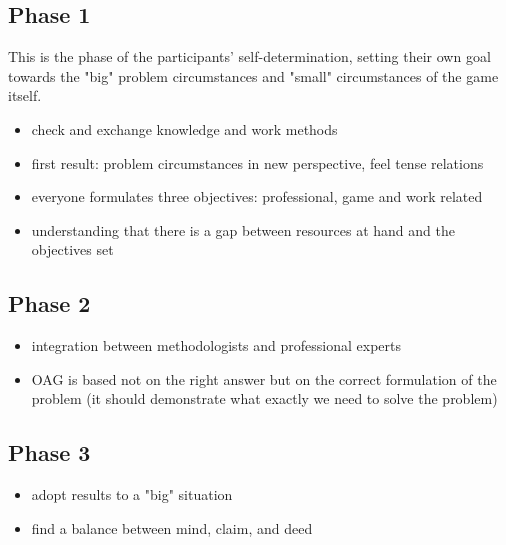 \documentclass[11pt]{article}
\begin{document}
\subsection{Phase 1}
This is the phase of the participants’ self-determination, setting their own goal towards the "big" problem circumstances and "small" circumstances of the game itself. 
\begin{itemize}
	\setlength\itemsep{0em}
	\item	check and exchange knowledge and work methods
	\item first result: problem circumstances in new perspective, feel tense relations
	\item everyone formulates three objectives: professional, game and work related
	\item understanding that there is a gap between resources at hand and the objectives set 
\end{itemize}

\subsection{Phase 2}
\begin{itemize}
	\setlength\itemsep{0em}
	\item	integration between methodologists and professional experts
	\item OAG is based not on the right answer but on the correct formulation of the problem (it should demonstrate what exactly we need to solve the problem)
\end{itemize}

\subsection{Phase 3}
\begin{itemize}
	\setlength\itemsep{0em}
	\item	 adopt results to a "big" situation
	\item find a balance between mind, claim, and deed
\end{itemize}
\end{document}
